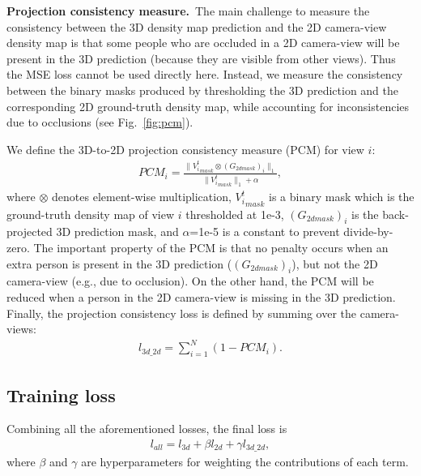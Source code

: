 \documentclass[letterpaper]{article} %
\begin{document}
\textbf{Projection consistency measure.}~The main challenge to measure the consistency between the 3D density map prediction and the 2D camera-view density map is that some people who are occluded in a 2D camera-view will be present in the 3D prediction (because they are visible from other views).  Thus the MSE loss cannot be used directly here.
Instead, we measure the consistency between the binary masks produced by thresholding %
the 3D prediction and the corresponding  2D ground-truth density map, while accounting for inconsistencies due to occlusions (see Fig.~\ref{fig:pcm}).

\par
We define the 3D-to-2D projection consistency measure (PCM) for view $i$:
\begin{align}
  PCM_{i} = \frac{\parallel {V_i^t}_{mask} \otimes (G_{2dmask})_{i} \parallel_1}{\parallel {V_i^t}_{mask} \parallel_1 + \alpha},
\end{align}
where $\otimes$ denotes element-wise multiplication, ${V_i^t}_{mask}$ is a binary mask which is the ground-truth density map of view $i$ thresholded at 1e-3, $(G_{2dmask})_{i}$ is the back-projected 3D prediction mask, and $\alpha$=1e-5 is a constant to prevent divide-by-zero.
%
The important property of the PCM is that no penalty occurs when an extra person is present in the 3D prediction ($(G_{2dmask})_{i}$), but not the 2D camera-view (e.g., due to occlusion). On the other hand, the PCM will be reduced when a person in the 2D camera-view is missing in the 3D prediction. Finally, the projection consistency loss is defined by summing over the camera-views:
\begin{align}
  l_{3d\_2d} = \sum_{i=1}^{N}(1 - PCM_{i}).
\end{align}

\subsection{Training loss}

Combining all the aforementioned losses, the final loss is
\begin{align}
  l_{all} = l_{3d} + \beta l_{2d} + \gamma l_{3d\_2d}, \label{loss_all}
\end{align}
where $\beta$ and $\gamma$ are hyperparameters for weighting the contributions of each term.
\end{document}
